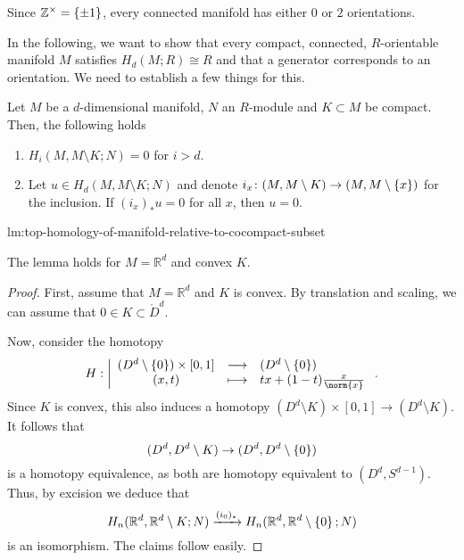 \begin{example}
  Since $\mathbb{Z}^{\times} = \left\{  \pm 1  \right\} $,
  every connected manifold has either $0$ or  $2$ orientations.
\end{example}

In the following,
we want to show that every compact, connected,
$R$-orientable manifold $M$ satisfies
$H_d(M;R) \cong R$ and that a generator corresponds
to an orientation.
We need to establish a few things for this.

\begin{lemma}
  \label{lm:top-homology-of-manifold-relative-to-cocompact-subset}
  Let $M$ be a $d$-dimensional manifold, $N$ an  $R$-module
  and  $K\subset M$ be compact.
  Then, the following holds
  \begin{enumerate}[h]
    \item $H_i(M, M\setminus K ; N) = 0$ for $i>d$.
    \item Let $u\in H_d(M, M \setminus K;N)$ and denote
      $i_x\colon (M, M \setminus K) \to  (M, M \setminus \left\{  x  \right\} )$
      for the inclusion.
      If $(i_x)_* u = 0$ for all  $x$, then $u=0$.
  \end{enumerate}
\end{lemma}

\begin{refproof}{lm:top-homology-of-manifold-relative-to-cocompact-subset}
  \begin{claim}
    The lemma holds for $M = \mathbb{R}^d$ and convex $K$.
  \end{claim}
  \begin{proof}
    First, assume that $M = \mathbb{R}^d$ and $K$ is convex.
    By translation and scaling, we can assume that
    $0\in K\subset \mathring{D}^d$.

    Now, consider the homotopy
      \begin{equation*}
      H: \left| \begin{array}{c c l} 
        (D^d \setminus \set{ 0 } ) \times [0,1]
        & \longrightarrow &
        (D^d \setminus \set{ 0 } ) \\
        (x,t) & \longmapsto &  tx + (1-t) \frac{x}{\norm{x}}
      \end{array} \right.
      .
    \end{equation*}
    Since $K$ is convex, this also induces a homotopy
    $(D^d \setminus K) \times [0,1] \to  (D^d \setminus K)$.
    It follows that
    \[
      (D^d, D^d \setminus K) \to (D^d, D^d \setminus \left\{  0  \right\} )
    \]
    is a homotopy equivalence,
    as both are homotopy equivalent to $(D^d, S^{d-1})$.
    Thus, by excision we deduce that
    \[
      H_n(\mathbb{R}^d, \mathbb{R}^d \setminus K;N)
      \xrightarrow{(i_0)_*} 
      H_n(\mathbb{R}^d, \mathbb{R}^d \setminus \left\{  0  \right\} ;N)
    \]
    is an isomorphism.
    The claims follow easily.
  \end{proof}
\end{refproof}
